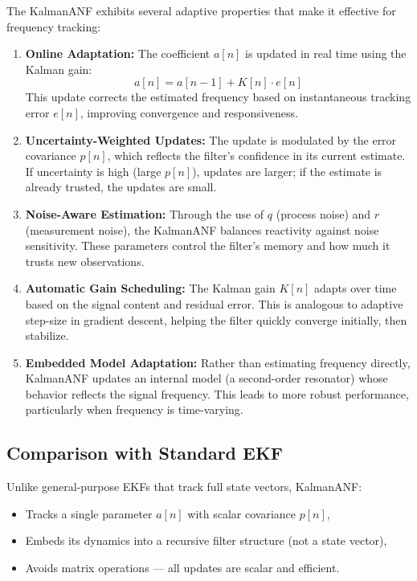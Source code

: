 \documentclass{article}
\begin{document}
The KalmanANF exhibits several adaptive properties that make it effective for frequency tracking:

\begin{enumerate}
  \item \textbf{Online Adaptation:} The coefficient \( a[n] \) is updated in real time using the Kalman gain:
  \[
  a[n] = a[n-1] + K[n] \cdot e[n]
  \]
  This update corrects the estimated frequency based on instantaneous tracking error \( e[n] \), improving convergence and responsiveness.

  \item \textbf{Uncertainty-Weighted Updates:} The update is modulated by the error covariance \( p[n] \), which reflects the filter's confidence in its current estimate. If uncertainty is high (large \( p[n] \)), updates are larger; if the estimate is already trusted, the updates are small.

  \item \textbf{Noise-Aware Estimation:} Through the use of \( q \) (process noise) and \( r \) (measurement noise), the KalmanANF balances reactivity against noise sensitivity. These parameters control the filter’s memory and how much it trusts new observations.

  \item \textbf{Automatic Gain Scheduling:} The Kalman gain \( K[n] \) adapts over time based on the signal content and residual error. This is analogous to adaptive step-size in gradient descent, helping the filter quickly converge initially, then stabilize.

  \item \textbf{Embedded Model Adaptation:} Rather than estimating frequency directly, KalmanANF updates an internal model (a second-order resonator) whose behavior reflects the signal frequency. This leads to more robust performance, particularly when frequency is time-varying.
\end{enumerate}

\subsection{Comparison with Standard EKF}

Unlike general-purpose EKFs that track full state vectors, KalmanANF:
\begin{itemize}
    \item Tracks a single parameter \( a[n] \) with scalar covariance \( p[n] \),
    \item Embeds its dynamics into a recursive filter structure (not a state vector),
    \item Avoids matrix operations — all updates are scalar and efficient.
\end{itemize}
\end{document}

